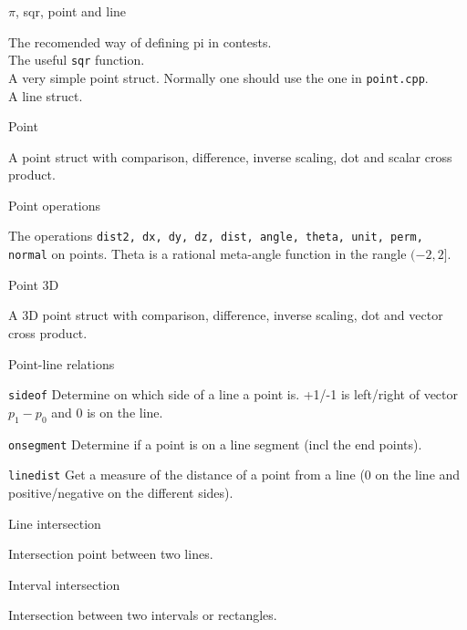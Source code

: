\begin{algorithm}{$\pi$, sqr, point and line}

The recomended way of defining pi in contests. \\
The useful {\tt sqr} function. \\
A very simple point struct.
Normally one should use the one in {\tt point.cpp}. \\
A line struct.
\end{algorithm}

\begin{algorithm}{Point}

A point struct with comparison, difference, inverse scaling, dot and
scalar cross product.
\end{algorithm}

\begin{algorithm}{Point operations}

The operations {\tt dist2, dx, dy, dz, dist, angle, theta, unit, perm, normal}
on points. Theta is a rational meta-angle function in the rangle $(-2,2]$.
\end{algorithm}

\begin{algorithm}{Point 3D}

A 3D point struct with comparison, difference, inverse scaling, dot and
vector cross product.
\end{algorithm}

\begin{algorithm}{Point-line relations}
\item[{\tt sideof}] Determine on which side of a line a point is.
+1/-1 is left/right of vector $p_1-p_0$ and 0 is on the line.
\item[{\tt onsegment}] Determine if a point is on a line segment (incl the end
points).
\item[{\tt linedist}] Get a measure of the distance of a point from a line
(0 on the line and positive/negative on the different sides).
\end{algorithm}

\begin{algorithm}{Line intersection}

Intersection point between two lines.
\end{algorithm}

\begin{algorithm}{Interval intersection}

Intersection between two intervals or rectangles.
\end{algorithm}

